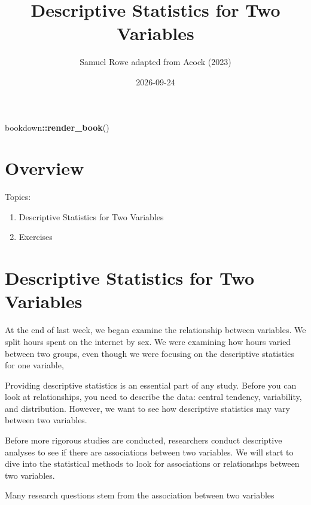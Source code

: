 \documentclass[
]{book}
\title{Descriptive Statistics for Two Variables}
\author{Samuel Rowe adapted from Acock (2023)}
\date{2026-09-24}
\newenvironment{Shaded}{\begin{snugshade}}{\end{snugshade}}
\newcommand{\FunctionTok}[1]{\textcolor[rgb]{0.13,0.29,0.53}{\textbf{#1}}}
\newcommand{\NormalTok}[1]{#1}
\newcommand{\SpecialCharTok}[1]{\textcolor[rgb]{0.81,0.36,0.00}{\textbf{#1}}}
\providecommand{\tightlist}{%
  \setlength{\itemsep}{0pt}\setlength{\parskip}{0pt}}
\begin{document}
\maketitle

{
\setcounter{tocdepth}{1}
\tableofcontents
}
\begin{Shaded}
\begin{Highlighting}[]
\NormalTok{bookdown}\SpecialCharTok{::}\FunctionTok{render\_book}\NormalTok{()}
\end{Highlighting}
\end{Shaded}

\chapter*{Overview}\label{overview}

Topics:

\begin{enumerate}
\def\labelenumi{\arabic{enumi}.}
\tightlist
\item
  Descriptive Statistics for Two Variables
\item
  Exercises
\end{enumerate}

\chapter{Descriptive Statistics for Two Variables}\label{descriptive-statistics-for-two-variables}

At the end of last week, we began examine the relationship between variables. We split hours spent on the internet by sex. We were examining how hours varied between two groups, even though we were focusing on the descriptive statistics for one variable,

Providing descriptive statistics is an essential part of any study. Before you can look at relationships, you need to describe the data: central tendency, variability, and distribution. However, we want to see how descriptive statistics may vary between two variables.

Before more rigorous studies are conducted, researchers conduct descriptive analyses to see if there are associations between two variables. We will start to dive into the statistical methods to look for associations or relationshps between two variables.

Many research questions stem from the association between two variables
\end{document}
